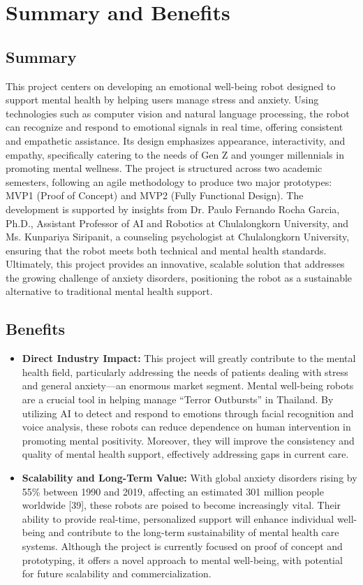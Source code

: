\section{Summary and Benefits}
\subsection{Summary}
This project centers on developing an emotional well-being robot designed to support mental health by helping users manage stress and anxiety. Using technologies such as computer vision and natural language processing, the robot can recognize and respond to emotional signals in real time, offering consistent and empathetic assistance. Its design emphasizes appearance, interactivity, and empathy, specifically catering to the needs of Gen Z and younger millennials in promoting mental wellness. The project is structured across two academic semesters, following an agile methodology to produce two major prototypes: MVP1 (Proof of Concept) and MVP2 (Fully Functional Design). The development is supported by insights from Dr. Paulo Fernando Rocha Garcia, Ph.D., Assistant Professor of AI and Robotics at Chulalongkorn University, and Ms. Kunpariya Siripanit, a counseling psychologist at Chulalongkorn University, ensuring that the robot meets both technical and mental health standards. Ultimately, this project provides an innovative, scalable solution that addresses the growing challenge of anxiety disorders, positioning the robot as a sustainable alternative to traditional mental health support.
\subsection{Benefits}
\begin{itemize}
    \item \textbf{Direct Industry Impact:} This project will greatly contribute to the mental health field, particularly addressing the needs of patients dealing with stress and general anxiety—an enormous market segment. Mental well-being robots are a crucial tool in helping manage “Terror Outbursts” in Thailand. By utilizing AI to detect and respond to emotions through facial recognition and voice analysis, these robots can reduce dependence on human intervention in promoting mental positivity. Moreover, they will improve the consistency and quality of mental health support, effectively addressing gaps in current care.
    \item \textbf{Scalability and Long-Term Value:} With global anxiety disorders rising by 55\% between 1990 and 2019, affecting an estimated 301 million people worldwide [39], these robots are poised to become increasingly vital. Their ability to provide real-time, personalized support will enhance individual well-being and contribute to the long-term sustainability of mental health care systems. Although the project is currently focused on proof of concept and prototyping, it offers a novel approach to mental well-being, with potential for future scalability and commercialization.
\end{itemize}

